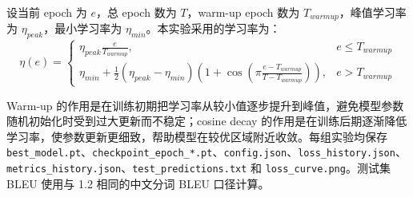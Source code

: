 ﻿\documentclass[UTF8,a4paper,12pt]{ctexart}
\begin{document}
设当前 epoch 为 $e$，总 epoch 数为 $T$，warm-up epoch 数为 $T_{warmup}$，峰值学习率为 $\eta_{peak}$，最小学习率为 $\eta_{min}$。本实验采用的学习率为：
\[
\eta(e)=
\begin{cases}
\eta_{peak}\frac{e}{T_{warmup}}, & e \leq T_{warmup} \\
\eta_{min}+\frac{1}{2}(\eta_{peak}-\eta_{min})
\left(1+\cos\left(\pi\frac{e-T_{warmup}}{T-T_{warmup}}\right)\right), & e > T_{warmup}
\end{cases}
\]

Warm-up 的作用是在训练初期把学习率从较小值逐步提升到峰值，避免模型参数随机初始化时受到过大更新而不稳定；cosine decay 的作用是在训练后期逐渐降低学习率，使参数更新更细致，帮助模型在较优区域附近收敛。每组实验均保存 \texttt{best\_model.pt}、\texttt{checkpoint\_epoch\_*.pt}、\texttt{config.json}、\texttt{loss\_history.json}、\texttt{metrics\_history.json}、\texttt{test\_predictions.txt} 和 \texttt{loss\_curve.png}。测试集 BLEU 使用与 1.2 相同的中文分词 BLEU 口径计算。

\begin{table}[H]
\centering
\caption{Cosine warm-up 不同峰值学习率实验结果}
\label{tab:cosine}
\end{table}
\end{document}
